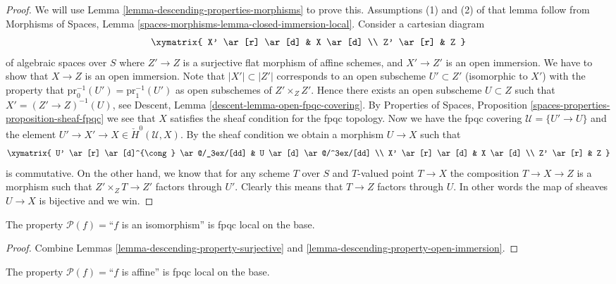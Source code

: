 \begin{proof}
We will use
Lemma \ref{lemma-descending-properties-morphisms}
to prove this. Assumptions (1) and (2) of that lemma follow from
Morphisms of Spaces,
Lemma \ref{spaces-morphisms-lemma-closed-immersion-local}.
Consider a cartesian diagram
$$
\xymatrix{
X' \ar[r] \ar[d] & X \ar[d] \\
Z' \ar[r] & Z
}
$$
of algebraic spaces over $S$
where $Z' \to Z$ is a surjective flat morphism of affine schemes,
and $X' \to Z'$ is an open immersion. We have to show that $X \to Z$
is an open immersion. Note that $|X'| \subset |Z'|$ corresponds to an
open subscheme $U' \subset Z'$ (isomorphic to $X'$)
with the property that $\text{pr}_0^{-1}(U') = \text{pr}_1^{-1}(U')$
as open subschemes of $Z' \times_Z Z'$. Hence there exists an open
subscheme $U \subset Z$ such that $X' = (Z' \to Z)^{-1}(U)$, see
Descent, Lemma \ref{descent-lemma-open-fpqc-covering}.
By Properties of Spaces,
Proposition \ref{spaces-properties-proposition-sheaf-fpqc}
we see that $X$ satisfies the sheaf condition for the fpqc topology.
Now we have the fpqc covering $\mathcal{U} = \{U' \to U\}$
and the element $U' \to X' \to X \in \check{H}^0(\mathcal{U}, X)$.
By the sheaf condition we obtain a morphism $U \to X$ such that
$$
\xymatrix{
U' \ar[r] \ar[d]^{\cong} \ar@/_3ex/[dd] & U \ar[d] \ar@/^3ex/[dd] \\
X' \ar[r] \ar[d] & X \ar[d] \\
Z' \ar[r] & Z
}
$$
is commutative. On the other hand, we know that for any scheme $T$ over $S$
and $T$-valued point $T \to X$ the composition $T \to X \to Z$ is a
morphism such that $Z' \times_Z T \to Z'$ factors through $U'$. Clearly
this means that $T \to Z$ factors through $U$. In other words the map
of sheaves $U \to X$ is bijective and we win.
\end{proof}

\begin{lemma}
\label{lemma-descending-property-isomorphism}
The property $\mathcal{P}(f) =$``$f$ is an isomorphism''
is fpqc local on the base.
\end{lemma}

\begin{proof}
Combine Lemmas \ref{lemma-descending-property-surjective}
and \ref{lemma-descending-property-open-immersion}.
\end{proof}

\begin{lemma}
\label{lemma-descending-property-affine}
The property $\mathcal{P}(f) =$``$f$ is affine''
is fpqc local on the base.
\end{lemma}

